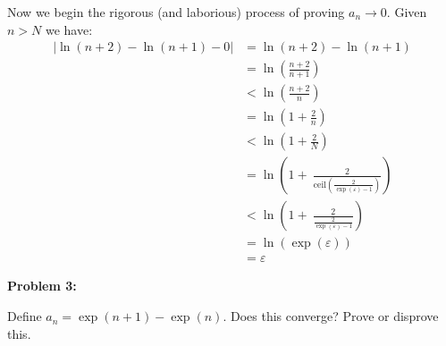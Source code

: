 \documentclass{article}
\theoremstyle{normal}
\newif\ifsolution
\begin{document}
                Now we begin the rigorous (and laborious) process of proving
                $a_{n}\rightarrow{0}$. Given $n>N$ we have:
                \begin{align}
                    |\ln(n+2)-\ln(n+1)-0|
                    &=\ln(n+2)-\ln(n+1)\\
                    &=\ln\left(
                        \frac{n+2}{n+1}
                    \right)\\
                    &<\ln\left(
                        \frac{n+2}{n}
                    \right)\\
                    &=
                    \ln\left(1+\frac{2}{n}\right)\\
                    &<\ln\left(1+\frac{2}{N}\right)\\
                    &=\ln\left(
                        1+\
                        \frac{2}{
                            \textrm{ceil}\left(
                                \frac{2}{\exp(\varepsilon)-1}
                            \right)
                        }
                    \right)\\
                    &<\ln\left(
                        1+\
                        \frac{2}{\frac{2}{\exp(\varepsilon)-1}}
                    \right)\\
                    &=\ln\left(\exp(\varepsilon)\right)\\
                    &=\varepsilon
                \end{align}
            \color{black}
        \fi
        \par\hfill\par
        \textbf{Problem 3:}
        \par
        Define $a_{n}=\exp(n+1)-\exp(n)$. Does this converge? Prove or
        disprove this.
        \par\hfill\par
        \ifsolution
            It does not. The negation of convergence is that for all
            $L\in\mathbb{R}$ there exists an $\varepsilon>0$ such that for all
            $N\in\mathbb{N}$ there is an $n\in\mathbb{N}$ with $n>N$ such that
            $|L-a_{n}|\geq\varepsilon$. But we do not need to rely on the
            definition since we have proven that a convergent sequence is a
            Cauchy sequence, and hence only need to show that this is not
            Cauchy. Pick $\varepsilon=1$. Given $N\in\mathbb{N}$ choose
            $n=N+1$ and $m=N+2$. The difference $|a_{n}-a_{m}|$ becomes
            arbitrary large as $N$ increased, so this is not a Cauchy sequence.
        \fi
\end{document}
